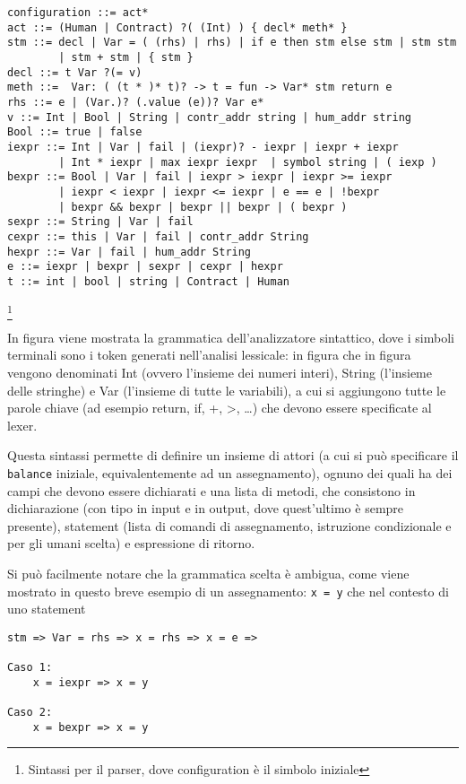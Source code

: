 \documentclass[]{article}
\begin{document}
\begin{verbatim}
configuration ::= act*
act ::= (Human | Contract) ?( (Int) ) { decl* meth* }
stm ::= decl | Var = ( (rhs) | rhs) | if e then stm else stm | stm stm 
        | stm + stm | { stm }
decl ::= t Var ?(= v)
meth ::=  Var: ( (t * )* t)? -> t = fun -> Var* stm return e
rhs ::= e | (Var.)? (.value (e))? Var e*
v ::= Int | Bool | String | contr_addr string | hum_addr string
Bool ::= true | false 
iexpr ::= Int | Var | fail | (iexpr)? - iexpr | iexpr + iexpr 
        | Int * iexpr | max iexpr iexpr  | symbol string | ( iexp )
bexpr ::= Bool | Var | fail | iexpr > iexpr | iexpr >= iexpr 
        | iexpr < iexpr | iexpr <= iexpr | e == e | !bexpr 
        | bexpr && bexpr | bexpr || bexpr | ( bexpr )  
sexpr ::= String | Var | fail
cexpr ::= this | Var | fail | contr_addr String
hexpr ::= Var | fail | hum_addr String
e ::= iexpr | bexpr | sexpr | cexpr | hexpr
t ::= int | bool | string | Contract | Human
\end{verbatim}

\footnote{Sintassi per il parser, dove configuration è il simbolo
  iniziale}

In figura viene mostrata la grammatica dell'analizzatore sintattico,
dove i simboli terminali sono i token generati nell'analisi lessicale:
in figura che in figura vengono denominati Int (ovvero l'insieme dei
numeri interi), String (l'insieme delle stringhe) e Var (l'insieme di
tutte le variabili), a cui si aggiungono tutte le parole chiave (ad
esempio return, if, +, \textgreater{}, \ldots{}) che devono essere
specificate al lexer.

Questa sintassi permette di definire un insieme di attori (a cui si può
specificare il \texttt{balance} iniziale, equivalentemente ad un
assegnamento), ognuno dei quali ha dei campi che devono essere
dichiarati e una lista di metodi, che consistono in dichiarazione (con
tipo in input e in output, dove quest'ultimo è sempre presente),
statement (lista di comandi di assegnamento, istruzione condizionale e
per gli umani scelta) e espressione di ritorno.

Si può facilmente notare che la grammatica scelta è ambigua, come viene
mostrato in questo breve esempio di un assegnamento: \texttt{x\ =\ y}
che nel contesto di uno statement

\begin{verbatim}
stm => Var = rhs => x = rhs => x = e =>

Caso 1:
    x = iexpr => x = y

Caso 2: 
    x = bexpr => x = y
\end{verbatim}
\end{document}
